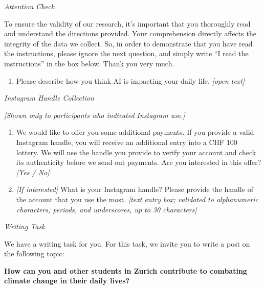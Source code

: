 \documentclass[12pt,notitlepage]{article}
\theoremstyle{plain}
\theoremstyle{plain}
\theoremstyle{definition}
\theoremstyle{definition}
\theoremstyle{assumption}
\theoremstyle{plain}
\theoremstyle{plain}
\theoremstyle{plain}
\theoremstyle{plain}
\theoremstyle{definition}%
\theoremstyle{plain}
\theoremstyle{plain}
\theoremstyle{plain}
\theoremstyle{plain}
\begin{document}
\vspace{12pt}
\emph{Attention Check}

To ensure the validity of our research, it's important that you thoroughly read and understand the directions provided. Your comprehension directly affects the integrity of the data we collect. So, in order to demonstrate that you have read the instructions, please ignore the next question, and simply write ``I read the instructions'' in the box below. Thank you very much.

\begin{enumerate}
\item Please describe how you think AI is impacting your daily life. \emph{[open text]}
\end{enumerate}

\vspace{12pt}
\emph{Instagram Handle Collection}

\emph{[Shown only to participants who indicated Instagram use.]}

\begin{enumerate}
\item We would like to offer you some additional payments. If you provide a valid Instagram handle, you will receive an additional entry into a CHF 100 lottery. We will use the handle you provide to verify your account and check its authenticity before we send out payments. Are you interested in this offer? \emph{[Yes / No]}
\item \emph{[If interested]} What is your Instagram handle? Please provide the handle of the account that you use the most. \emph{[text entry box; validated to alphanumeric characters, periods, and underscores, up to 30 characters]}
\end{enumerate}


\vspace{12pt}
\emph{Writing Task}

We have a writing task for you. For this task, we invite you to write a post on the following topic:

\textbf{How can you and other students in Zurich contribute to combating climate change in their daily lives?}
\end{document}
